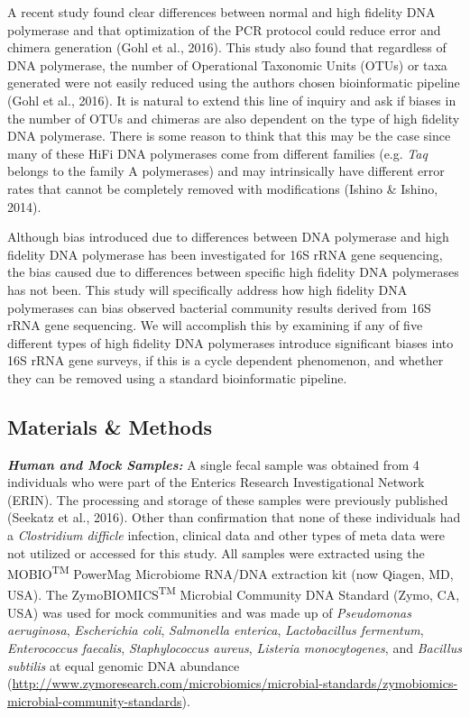 \documentclass[12pt,]{article}
\begin{document}
A recent study found clear differences between normal and high fidelity
DNA polymerase and that optimization of the PCR protocol could reduce
error and chimera generation (Gohl et al., 2016). This study also found
that regardless of DNA polymerase, the number of Operational Taxonomic
Units (OTUs) or taxa generated were not easily reduced using the authors
chosen bioinformatic pipeline (Gohl et al., 2016). It is natural to
extend this line of inquiry and ask if biases in the number of OTUs and
chimeras are also dependent on the type of high fidelity DNA polymerase.
There is some reason to think that this may be the case since many of
these HiFi DNA polymerases come from different families (e.g. \emph{Taq}
belongs to the family A polymerases) and may intrinsically have
different error rates that cannot be completely removed with
modifications (Ishino \& Ishino, 2014).

Although bias introduced due to differences between DNA polymerase and
high fidelity DNA polymerase has been investigated for 16S rRNA gene
sequencing, the bias caused due to differences between specific high
fidelity DNA polymerases has not been. This study will specifically
address how high fidelity DNA polymerases can bias observed bacterial
community results derived from 16S rRNA gene sequencing. We will
accomplish this by examining if any of five different types of high
fidelity DNA polymerases introduce significant biases into 16S rRNA gene
surveys, if this is a cycle dependent phenomenon, and whether they can
be removed using a standard bioinformatic pipeline.

\newpage

\subsection{Materials \& Methods}\label{materials-methods}

\textbf{\emph{Human and Mock Samples:}} A single fecal sample was
obtained from 4 individuals who were part of the Enterics Research
Investigational Network (ERIN). The processing and storage of these
samples were previously published (Seekatz et al., 2016). Other than
confirmation that none of these individuals had a \emph{Clostridium
difficle} infection, clinical data and other types of meta data were not
utilized or accessed for this study. All samples were extracted using
the MOBIO\textsuperscript{TM} PowerMag Microbiome RNA/DNA extraction kit
(now Qiagen, MD, USA). The ZymoBIOMICS\textsuperscript{TM} Microbial
Community DNA Standard (Zymo, CA, USA) was used for mock communities and
was made up of \emph{Pseudomonas aeruginosa}, \emph{Escherichia coli},
\emph{Salmonella enterica}, \emph{Lactobacillus fermentum},
\emph{Enterococcus faecalis}, \emph{Staphylococcus aureus},
\emph{Listeria monocytogenes}, and \emph{Bacillus subtilis} at equal
genomic DNA abundance
(\url{http://www.zymoresearch.com/microbiomics/microbial-standards/zymobiomics-microbial-community-standards}).
\end{document}
